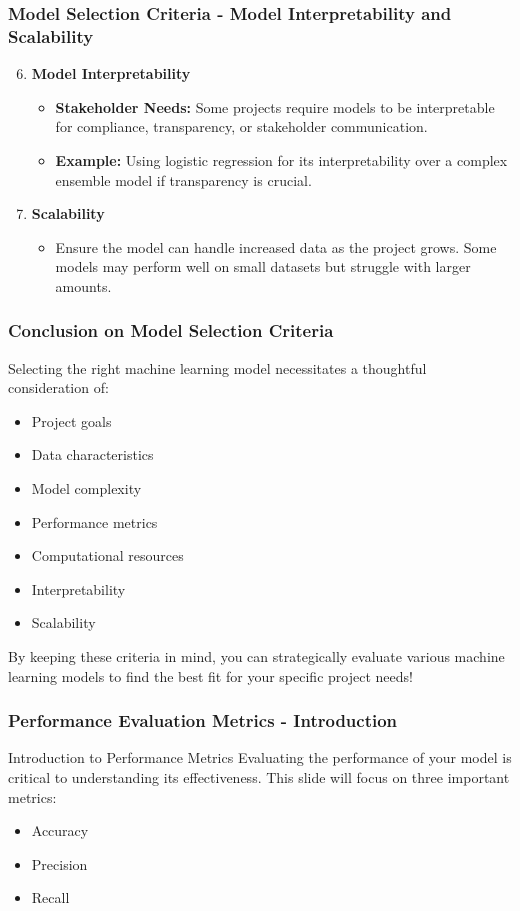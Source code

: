 \documentclass[aspectratio=169]{beamer}
\begin{document}
\begin{frame}[fragile]
    \frametitle{Model Selection Criteria - Model Interpretability and Scalability}
    \begin{enumerate}
        \setcounter{enumi}{5}
        \item \textbf{Model Interpretability}
        \begin{itemize}
            \item \textbf{Stakeholder Needs:} Some projects require models to be interpretable for compliance, transparency, or stakeholder communication.
            \item \textbf{Example:} Using logistic regression for its interpretability over a complex ensemble model if transparency is crucial.
        \end{itemize}
        
        \item \textbf{Scalability}
        \begin{itemize}
            \item Ensure the model can handle increased data as the project grows. Some models may perform well on small datasets but struggle with larger amounts.
        \end{itemize}
    \end{enumerate}
\end{frame}

\begin{frame}[fragile]
    \frametitle{Conclusion on Model Selection Criteria}
    Selecting the right machine learning model necessitates a thoughtful consideration of:
    \begin{itemize}
        \item Project goals
        \item Data characteristics
        \item Model complexity
        \item Performance metrics
        \item Computational resources
        \item Interpretability
        \item Scalability
    \end{itemize}
    By keeping these criteria in mind, you can strategically evaluate various machine learning models to find the best fit for your specific project needs!
\end{frame}

\begin{frame}[fragile]
    \frametitle{Performance Evaluation Metrics - Introduction}
    \begin{block}{Introduction to Performance Metrics}
        Evaluating the performance of your model is critical to understanding its effectiveness.
        This slide will focus on three important metrics:
        \begin{itemize}
            \item Accuracy
            \item Precision
            \item Recall
        \end{itemize}
    \end{block}
\end{frame}
\end{document}
